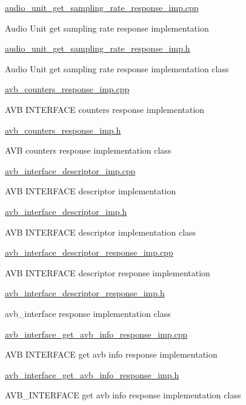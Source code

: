 \hyperlink{audio__unit__get__sampling__rate__response__imp_8cpp}{audio\+\_\+unit\+\_\+get\+\_\+sampling\+\_\+rate\+\_\+response\+\_\+imp.\+cpp}

Audio Unit get sampling rate response implementation

\hyperlink{audio__unit__get__sampling__rate__response__imp_8h}{audio\+\_\+unit\+\_\+get\+\_\+sampling\+\_\+rate\+\_\+response\+\_\+imp.\+h}

Audio Unit get sampling rate response implementation class

\hyperlink{avb__counters__response__imp_8cpp}{avb\+\_\+counters\+\_\+response\+\_\+imp.\+cpp}

A\+VB I\+N\+T\+E\+R\+F\+A\+CE counters response implementation

\hyperlink{avb__counters__response__imp_8h}{avb\+\_\+counters\+\_\+response\+\_\+imp.\+h}

A\+VB counters response implementation class

\hyperlink{avb__interface__descriptor__imp_8cpp}{avb\+\_\+interface\+\_\+descriptor\+\_\+imp.\+cpp}

A\+VB I\+N\+T\+E\+R\+F\+A\+CE descriptor implementation

\hyperlink{avb__interface__descriptor__imp_8h}{avb\+\_\+interface\+\_\+descriptor\+\_\+imp.\+h}

A\+VB I\+N\+T\+E\+R\+F\+A\+CE descriptor implementation class

\hyperlink{avb__interface__descriptor__response__imp_8cpp}{avb\+\_\+interface\+\_\+descriptor\+\_\+response\+\_\+imp.\+cpp}

A\+VB I\+N\+T\+E\+R\+F\+A\+CE descriptor response implementation

\hyperlink{avb__interface__descriptor__response__imp_8h}{avb\+\_\+interface\+\_\+descriptor\+\_\+response\+\_\+imp.\+h}

avb\+\_\+interface response implementation class

\hyperlink{avb__interface__get__avb__info__response__imp_8cpp}{avb\+\_\+interface\+\_\+get\+\_\+avb\+\_\+info\+\_\+response\+\_\+imp.\+cpp}

A\+VB I\+N\+T\+E\+R\+F\+A\+CE get avb info response implementation

\hyperlink{avb__interface__get__avb__info__response__imp_8h}{avb\+\_\+interface\+\_\+get\+\_\+avb\+\_\+info\+\_\+response\+\_\+imp.\+h}

A\+V\+B\+\_\+\+I\+N\+T\+E\+R\+F\+A\+CE get avb info response implementation class

